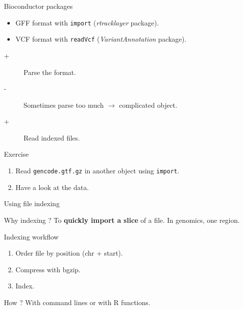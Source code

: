 \documentclass[10pt]{beamer}
\begin{document}
\begin{frame}[fragile]{Bioconductor packages}
  \begin{block}{}
    \begin{itemize}
    \item GFF format with \verb!import! ({\it rtracklayer} package).
    \item VCF format with \verb!readVcf! ({\it VariantAnnotation} package).
    \end{itemize}
  \end{block}
  \begin{block}{}
    \begin{description}
    \item[+] Parse the format.
    \item[-] Sometimes parse too much $\rightarrow$ complicated object.
    \item[+] Read indexed files.
    \end{description}
  \end{block}

  \begin{alertblock}{Exercise}
    \begin{enumerate}
    \item Read \verb!gencode.gtf.gz! in another object using \verb!import!.
    \item Have a look at the data.
    \end{enumerate}
  \end{alertblock}
\end{frame}

\begin{frame}{Using file indexing}
  \begin{block}{Why indexing ?}
    To \textbf{quickly import a slice} of a file. In genomics, one region.
  \end{block}
  \bigskip
  \begin{block}{Indexing workflow}
    \begin{enumerate}
    \item Order file by position (chr + start).
    \item Compress with bgzip.
    \item Index.
    \end{enumerate}
  \end{block}
  \bigskip
  \begin{block}{How ?}
    With command lines or with R functions.
  \end{block}
\end{frame}
\end{document}
